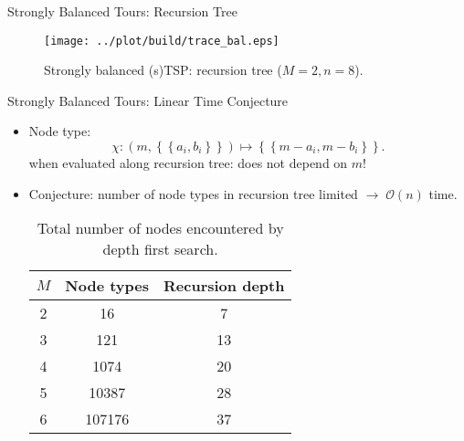 \documentclass[
  size=8pt,
  style=klope,
  paper=screen,
  mode=present,
  nohandoutpagebreaks,
  pauseslide,
  hlsections,
  fleqn,
]{powerdot}
\def\board{{\color{green} [Optional: board.]}}
\def\eqitspace{\vspace{-5mm}}
\begin{document}
\begin{slide}[toc=]{Strongly Balanced Tours: Recursion Tree}
  \begin{figure}[H]
    \centering
    \texttt{[image: ../plot/build/trace\_bal.eps]}
    \caption{Strongly balanced (s)TSP: recursion tree ($M=2,n=8$).}
  \end{figure}
\end{slide}

\begin{slide}[toc=]{Strongly Balanced Tours: Linear Time Conjecture}
  \begin{itemize}
  \item
    Node type:
    \begin{equation}
    \chi : \left(m,\left\{\left\{a_i,b_i\right\}\right\}\right)
    \mapsto
     \left\{\left\{m-a_i,m-b_i\right\}\right\}.
   \end{equation}
   when evaluated along recursion tree: does not depend on $m$!
   \item
   Conjecture: number of node types in recursion tree limited
   $\rightarrow \; \mathcal{O}\left(n\right)$ time.
    \begin{table}[htpb]
    \centering
    \begin{tabular}{cSc}
      \toprule
      {\bfseries $M$ } &
      {\bfseries Node types} &
      {\bfseries Recursion depth } \\
       &     16 &  7 \\
      3 &    121 & 13 \\
      4 &   1074 & 20 \\
      5 &  10387 & 28 \\
      6 & 107176 & 37 \\
      \bottomrule
    \end{tabular}
    \caption{Total number of nodes encountered by depth first search.}
    \end{table}
  \end{itemize}
\end{slide}
\end{document}

